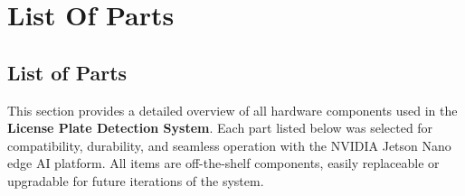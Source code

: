 %
%

\chapter{List Of Parts}

\section{List of Parts}

This section provides a detailed overview of all hardware components used in the \textbf{License Plate Detection System}.  
Each part listed below was selected for compatibility, durability, and seamless operation with the NVIDIA Jetson Nano edge AI platform.  
All items are off-the-shelf components, easily replaceable or upgradable for future iterations of the system.

\vspace{0.5cm}

